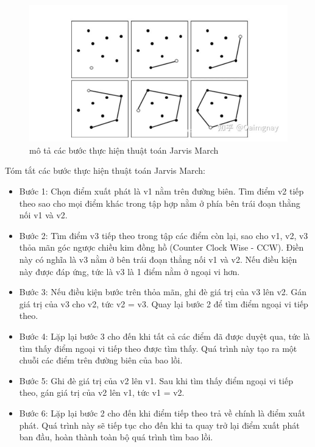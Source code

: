 \documentclass[12pt,a4paper,openany,oneside]{report}
\begin{document}
\begin{figure}[ht!]
	\begin{center}
		\includegraphics[width=435px]{./jarvis_march_steps.jpg}
		\caption{mô tả các bước thực hiện thuật toán Jarvis March}
		\label{fig_dhandang1}
	\end{center}
\end{figure} 
Tóm tắt các bước thực hiện thuật toán Jarvis March:

\begin{itemize}
	\item Bước 1: Chọn điểm xuất phát là v1 nằm trên đường biên. Tìm điểm v2 tiếp theo sao cho mọi điểm khác trong tập hợp nằm ở phía bên trái đoạn thằng nối v1 và v2.
	\item Bước 2: Tìm điểm v3 tiếp theo trong tập các điểm còn lại, sao cho v1, v2, v3 thỏa mãn góc ngược chiều kim đồng hồ (Counter Clock Wise - CCW). Điền này có nghĩa là v3 nằm ở bên trái đoạn thẳng nối v1 và v2. Nếu điều kiện này được đáp ứng, tức là v3 là 1 điểm nằm ở ngoại vi hơn.
	\item Bước 3: Nếu điều kiện bước trên thỏa mãn, ghi đè giá trị của v3 lên v2. Gán giá trị của v3 cho v2, tức v2 = v3. Quay lại bước 2 để tìm điểm ngoại vi tiếp theo.
	\item Bước 4: Lặp lại bước 3 cho đến khi tất cả các điểm đã được duyệt qua, tức là tìm thấy điểm ngoại vi tiếp theo được tìm thấy. Quá trình này tạo ra một chuỗi các điểm trên đường biên của bao lồi.
	\item Bước 5: Ghi đè giá trị của v2 lên v1. Sau khi tìm thấy điểm ngoại vi tiếp theo, gán giá trị của v2 lên v1, tức v1 = v2.
	\item  Bước 6: Lặp lại bước 2 cho đến khi điểm tiếp theo trả về chính là điểm xuất phát. Quá trình này sẽ tiếp tục cho đến khi ta quay trở lại điểm xuất phát ban đầu, hoàn thành toàn bộ quá trình tìm bao lồi.
\end{itemize}
\end{document}
